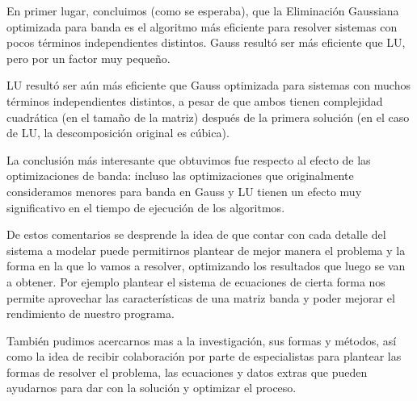 \par En primer lugar, concluimos (como se esperaba), que la Eliminaci\'on Gaussiana optimizada para banda es el algoritmo m\'as eficiente para resolver sistemas con pocos t\'erminos independientes distintos. Gauss result\'o ser m\'as eficiente que LU, pero por un factor muy peque\~no.
\par LU result\'o ser a\'un m\'as eficiente que Gauss optimizada para sistemas con muchos t\'erminos independientes distintos, a pesar de que ambos tienen complejidad cuadr\'atica (en el tama\~no de la matriz) despu\'es de la primera soluci\'on (en el caso de LU, la descomposici\'on original es c\'ubica).
\par La conclusi\'on m\'as interesante que obtuvimos fue respecto al efecto de las optimizaciones de banda: incluso las optimizaciones que originalmente consideramos menores para banda en Gauss y LU tienen un efecto muy significativo en el tiempo de ejecuci\'on de los algoritmos.
\par De estos comentarios se desprende la idea de que contar con cada detalle del sistema a modelar puede permitirnos plantear de mejor manera el problema y la forma en la que lo vamos a resolver, optimizando los resultados que luego se van a obtener. Por ejemplo plantear el sistema de ecuaciones de cierta forma nos permite aprovechar las características de una matriz banda y poder mejorar el rendimiento de nuestro programa.
\par También pudimos acercarnos mas a la investigación, sus formas y métodos, así como la idea de recibir colaboración por parte de especialistas para plantear las formas de resolver el problema, las ecuaciones y datos extras que pueden ayudarnos para dar con la solución y optimizar el proceso.